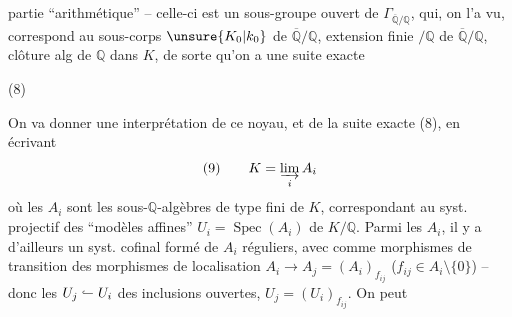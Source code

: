 partie ``arithmétique'' -- celle-ci est un sous-groupe ouvert de $\Gamma_{\overline{\mathbb Q}/\mathbb Q}$, qui, on l'a vu, correspond au sous-corps $\unsure{K_0|k_0}$ de $\overline{\mathbb Q}/\mathbb Q$,  extension finie $/\mathbb Q$ de $\overline{\mathbb Q}/\mathbb Q$, clôture alg de $\mathbb Q$ dans $K$, de sorte qu'on a une suite exacte

\noindent (8)\quad{}

On va donner une interprétation de ce noyau, et de la suite exacte (8), en écrivant
\[
(9)\qquad K=\varinjlim_i A_i
\]
où les $A_i$ sont les sous-$\mathbb Q$-algèbres de type fini de $K$, correspondant au syst. projectif des ``modèles affines'' $U_i=\operatorname{Spec}(A_i)$ de $K/\mathbb Q$. Parmi les $A_i$, il y a d'ailleurs un syst. cofinal formé de $A_i$ réguliers,  avec comme morphismes de transition des morphismes de localisation $A_i\longrightarrow A_j=(A_i)_{f_{ij}}$ ($f_{ij}\in A_i\setminus\{0\}$) -- donc les $U_j\lhook\joinrel\relbar U_i$ des inclusions ouvertes, $U_j=(U_i)_{f_{ij}}$. On peut
